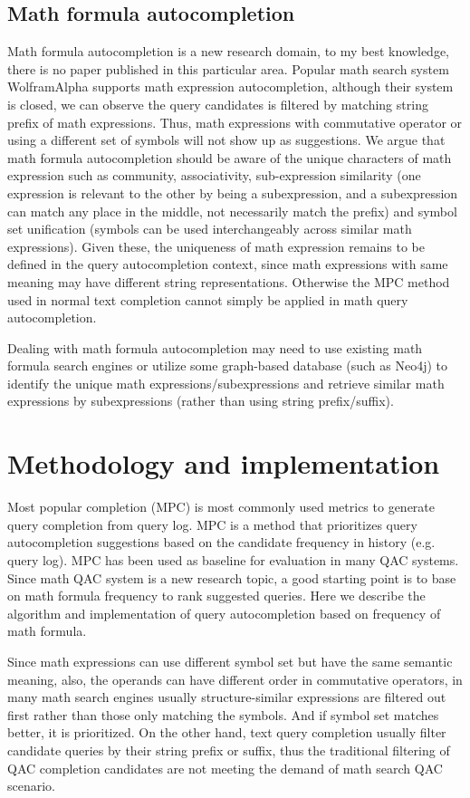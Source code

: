 \documentclass[12pt]{article} %
\begin{document}
\subsection{Math formula autocompletion}
Math formula autocompletion is a new research domain, to my best knowledge, there is no paper published in this particular area. 
Popular math search system WolframAlpha supports math expression autocompletion, although their system is closed, we can observe the query candidates is filtered by matching string prefix of math expressions. 
Thus, math expressions with commutative operator or using a different set of symbols will not show up as suggestions.
We argue that math formula autocompletion should be aware of the unique characters of math expression such as community, associativity, sub-expression similarity (one expression is relevant to the other by being a subexpression, and a subexpression can match any place in the middle, not necessarily match the prefix) and symbol set unification (symbols can be used interchangeably across similar math expressions).
Given these, the uniqueness of math expression remains to be defined in the query autocompletion context, since math expressions with same meaning may have different string representations. Otherwise the MPC method used in normal text completion cannot simply be applied in math query autocompletion.

Dealing with math formula autocompletion may need to use existing math formula search engines or utilize some graph-based database (such as Neo4j) to identify the unique math expressions/subexpressions and retrieve similar math expressions by subexpressions (rather than using string prefix/suffix).

\section{Methodology and implementation}
Most popular completion (MPC) is most commonly used metrics to generate query completion from query
log.
MPC is a method that prioritizes query autocompletion suggestions based on the candidate frequency in history (e.g. query log).
MPC has been used as baseline for evaluation in many QAC systems.
Since math QAC system is a new research topic, a good starting point is to base on math formula frequency to rank suggested queries.
Here we describe the algorithm and implementation of query autocompletion based on frequency of math formula.

Since math expressions can use different symbol set but have the same semantic meaning, also, the operands can have different order in commutative operators,
in many math search engines usually structure-similar expressions are filtered out first rather than those only matching the symbols.
And if symbol set matches better, it is prioritized.
On the other hand, text query completion usually filter candidate queries by their string prefix or suffix, thus the traditional filtering of QAC completion candidates are not meeting the demand of math search QAC scenario.
\end{document}
